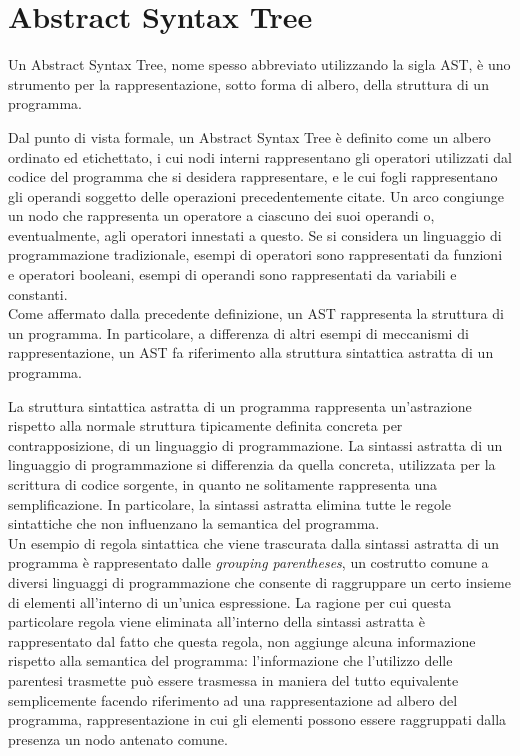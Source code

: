 \section{Abstract Syntax Tree}

Un Abstract Syntax Tree, nome spesso abbreviato utilizzando la sigla AST, è uno
strumento per la rappresentazione, sotto forma di albero, della struttura di un
programma.

Dal punto di vista formale, un Abstract Syntax Tree è definito come un albero
ordinato ed etichettato, i cui nodi interni rappresentano gli operatori
utilizzati dal codice del programma che si desidera rappresentare, e le cui
fogli rappresentano gli operandi soggetto delle operazioni precedentemente
citate. Un arco congiunge un nodo che rappresenta un operatore a ciascuno dei
suoi operandi o, eventualmente, agli operatori innestati a questo. Se si
considera un linguaggio di programmazione tradizionale, esempi di operatori sono
rappresentati da funzioni e operatori booleani, esempi di operandi sono
rappresentati da variabili e constanti.\\

Come affermato dalla precedente definizione, un AST rappresenta la struttura di
un programma. In particolare, a differenza di altri esempi di meccanismi di
rappresentazione, un AST fa riferimento alla struttura sintattica astratta di
un programma.

La struttura sintattica astratta di un programma rappresenta un’astrazione
rispetto alla normale struttura tipicamente definita concreta per
contrapposizione, di un linguaggio di programmazione. La sintassi astratta di un
linguaggio di programmazione si differenzia da quella concreta, utilizzata per
la scrittura di codice sorgente, in quanto ne solitamente rappresenta una
semplificazione. In particolare, la sintassi astratta elimina tutte le regole
sintattiche che non influenzano la semantica del programma.\\

Un esempio di regola sintattica che viene trascurata dalla sintassi astratta di
un programma è rappresentato dalle \textit{grouping parentheses}, un costrutto
comune a diversi linguaggi di programmazione che consente di raggruppare un
certo insieme di elementi all'interno di un'unica espressione. La ragione per
cui questa particolare regola viene eliminata all’interno della sintassi
astratta è rappresentato dal fatto che questa regola, non aggiunge alcuna
informazione rispetto alla semantica del programma: l’informazione che
l’utilizzo delle parentesi trasmette può essere trasmessa in maniera del tutto
equivalente semplicemente facendo riferimento ad una rappresentazione ad albero
del programma, rappresentazione in cui gli elementi possono essere raggruppati
dalla presenza un nodo antenato comune.

